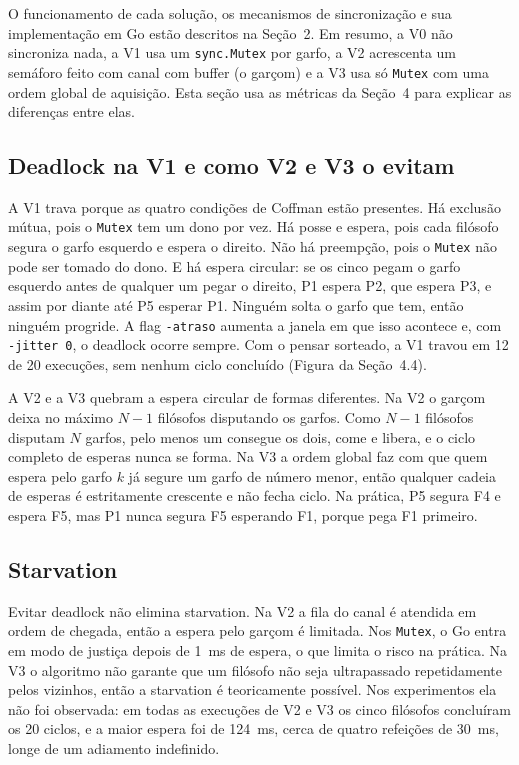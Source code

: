 \documentclass[12pt,brazil,a4paper]{article}
\begin{document}
O funcionamento de cada solução, os mecanismos de sincronização e sua implementação em Go estão descritos na Seção~2. Em resumo, a V0 não sincroniza nada, a V1 usa um \texttt{sync.Mutex} por garfo, a V2 acrescenta um semáforo feito com canal com buffer (o garçom) e a V3 usa só \texttt{Mutex} com uma ordem global de aquisição. Esta seção usa as métricas da Seção~4 para explicar as diferenças entre elas.

\subsection{Deadlock na V1 e como V2 e V3 o evitam}
A V1 trava porque as quatro condições de Coffman estão presentes. Há exclusão mútua, pois o \texttt{Mutex} tem um dono por vez. Há posse e espera, pois cada filósofo segura o garfo esquerdo e espera o direito. Não há preempção, pois o \texttt{Mutex} não pode ser tomado do dono. E há espera circular: se os cinco pegam o garfo esquerdo antes de qualquer um pegar o direito, P1 espera P2, que espera P3, e assim por diante até P5 esperar P1. Ninguém solta o garfo que tem, então ninguém progride. A flag \texttt{-atraso} aumenta a janela em que isso acontece e, com \texttt{-jitter 0}, o deadlock ocorre sempre. Com o pensar sorteado, a V1 travou em 12 de 20 execuções, sem nenhum ciclo concluído (Figura da Seção~4.4).

A V2 e a V3 quebram a espera circular de formas diferentes. Na V2 o garçom deixa no máximo $N-1$ filósofos disputando os garfos. Como $N-1$ filósofos disputam $N$ garfos, pelo menos um consegue os dois, come e libera, e o ciclo completo de esperas nunca se forma. Na V3 a ordem global faz com que quem espera pelo garfo $k$ já segure um garfo de número menor, então qualquer cadeia de esperas é estritamente crescente e não fecha ciclo. Na prática, P5 segura F4 e espera F5, mas P1 nunca segura F5 esperando F1, porque pega F1 primeiro.

\subsection{Starvation}
Evitar deadlock não elimina starvation. Na V2 a fila do canal é atendida em ordem de chegada, então a espera pelo garçom é limitada. Nos \texttt{Mutex}, o Go entra em modo de justiça depois de 1~ms de espera, o que limita o risco na prática. Na V3 o algoritmo não garante que um filósofo não seja ultrapassado repetidamente pelos vizinhos, então a starvation é teoricamente possível. Nos experimentos ela não foi observada: em todas as execuções de V2 e V3 os cinco filósofos concluíram os 20 ciclos, e a maior espera foi de 124~ms, cerca de quatro refeições de 30~ms, longe de um adiamento indefinido.
\end{document}
